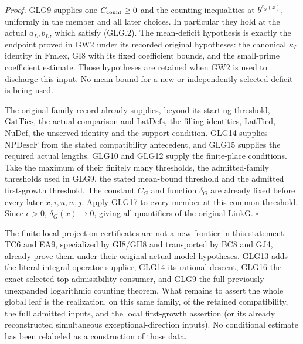 \documentclass[11pt,a4paper]{article}
\numberwithin{equation}{section}
\theoremstyle{remark}\newtheorem{remark}[theorem]{Remark}
\begin{document}
\emph{Proof.}
GLG9 supplies one \(C_{\rm count}\ge0\) and the counting
inequalities at \(b^{\delta_G(x)}\), uniformly in the
member and all later choices. In particular they hold
at the actual \(a_L,b_L\), which satisfy (GLG.2).
The mean-deficit hypothesis is exactly the endpoint
proved in GW2 under its recorded original hypotheses:
the canonical \(\kappa_I\) identity in \(\mathrm{Fm.ex}\),
GI8 with its fixed coefficient bounds, and the small-prime
coefficient estimate. Those hypotheses are retained
when GW2 is used to discharge this input. No mean bound
for a new or independently selected deficit is being used.

The original family record already supplies, beyond
its starting threshold, \(\mathrm{GatTies}\), the actual
comparison and \(\mathrm{LatDefs}\), the filling identities,
\(\mathrm{LatTied}\), \(\mathrm{NuDef}\), the unserved
identity and the support condition. GLG14 supplies
\(\mathrm{NPDescF}\) from the stated compatibility
antecedent, and GLG15 supplies the required actual lengths.
GLG10 and GLG12 supply the finite-place conditions.
Take the maximum of their finitely many thresholds,
the admitted-family thresholds used in GLG9, the
stated mean-bound threshold and the admitted
first-growth threshold.
The constant \(C_G\) and function \(\delta_G\) are
already fixed before every later \(x,i,u,w,j\).
Apply GLG17 to every member at this common threshold.
Since \(\epsilon>0\), \(\delta_G(x)\to0\), giving
all quantifiers of the original \(\mathrm{LinkG}\).
\hfill\(\square\)

The finite local projection certificates are not a new
frontier in this statement: TC6 and EA9, specialized by
GI8/GII8 and transported by BC8 and GJ4, already prove them
under their original actual-model hypotheses. GLG13
adds the literal integral-operator supplier, GLG14
its rational descent, GLG16 the exact selected-top
admissibility consumer, and GLG9 the full previously
unexpanded logarithmic counting theorem. What remains
to assert the whole global leaf is the realization,
on this same family, of the retained compatibility,
the full admitted inputs, and the local first-growth
assertion (or its already reconstructed simultaneous
exceptional-direction inputs). No conditional estimate
has been relabeled as a construction of those data.

\endgroup
\end{document}
